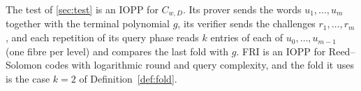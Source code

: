 The test of \cref{sec:test} is an IOPP for $C_{w,D}$. Its prover sends the words
$u_1,\dots,u_m$ together with the terminal polynomial $g$, its verifier sends the challenges
$r_1,\dots,r_m$, and each repetition of its query phase reads $k$ entries of each of
$u_0,\dots,u_{m-1}$ (one fibre per level) and compares the last fold with $g$. FRI \cite{BBHR18} is an IOPP for
Reed--Solomon codes with logarithmic round and query complexity, and the fold it uses is the
case $k=2$ of Definition~\ref{def:fold}.
